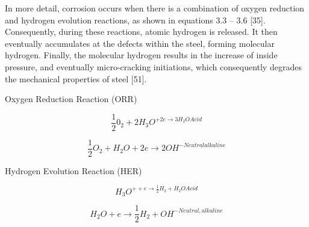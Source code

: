\documentclass[12pt]{report}
\begin{document}

In more detail, corrosion occurs when there is a combination of oxygen reduction and hydrogen evolution reactions, as shown in equations 3.3 – 3.6 [35].  Consequently, during these reactions, atomic hydrogen is released. It then eventually accumulates at the defects within the steel, forming molecular hydrogen. Finally, the molecular hydrogen results in the increase of inside pressure, and eventually micro-cracking initiations, which consequently degrades the mechanical properties of steel [51].

\begin{center}
    Oxygen Reduction Reaction (ORR)
\end{center}

\begin{equation}
    \frac{1}{2}0_2 + 2H_3O^{+2e \rightarrow 3H_2OAcid}
\end{equation}

\begin{equation}
    \frac{1}{2}O_2 + H_2O + 2e \rightarrow 2OH^{-Neutralalkaline}
\end{equation}

\begin{center}
    Hydrogen Evolution Reaction (HER)
\end{center}

\begin{equation}
    H_3O^{++e \rightarrow \frac{1}{2}H_2 + H_2OAcid}
\end{equation}

\begin{equation}
    H_2O + e \rightarrow \frac{1}{2}H_2 + OH^{-Neutral,alkaline}
\end{equation}
\end{document}
